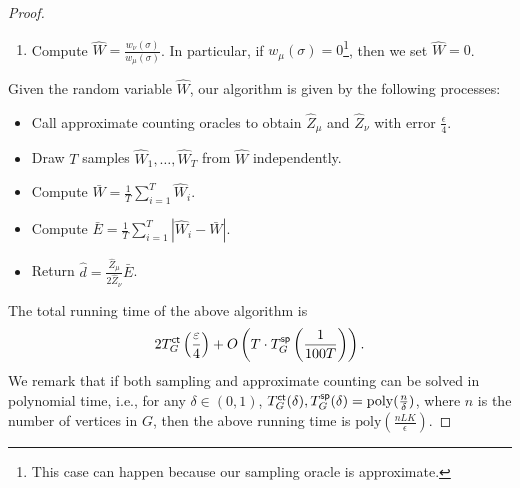 \begin{proof}
\begin{enumerate}
\item Compute $\hat{W}=\frac{w_\nu(\sigma)}{w_\mu(\sigma)}$. In particular, if $w_\mu(\sigma)=0$\footnote{This case can happen because our sampling oracle is approximate.}, then we set $\hat{W} = 0$.
\end{enumerate}
Given the random variable $\hat{W}$, our algorithm is given by the following processes:
\begin{tcolorbox}[colback=lightgray!20, colframe=lightgray!18, coltitle=black, title={\textbf{Basic algorithm for instances satisfying \Cref{cond:meta}}}]
    \begin{itemize}
        \item Call approximate counting oracles to obtain $\hat{Z}_\mu$ and $\hat{Z}_\nu$ with error $\frac{\epsilon}{4}$.
        \item Draw $T$ samples $\hat{W}_1,\dots, \hat{W}_T$ from $\hat{W}$ independently.
        \item Compute $\bar{W}=\frac{1}{T}\sum_{i=1}^T \hat{W}_i$.
        \item Compute $\bar{E}=\frac{1}{T}\sum_{i=1}^{T} |\hat{W}_i-\bar{W}|$.
        \item Return $\hat{d}=\frac{\hat{Z}_\mu}{2\hat{Z}_\nu}\bar{E}$.
        \end{itemize}
    \end{tcolorbox}
The total running time of the above algorithm is 
\begin{align*}
    2T^{\textsf{ct}}_G\left(\frac{\varepsilon}{4}\right) + O\left(T \cdot T^{\textsf{sp}}_G\left(\frac{1}{100T}\right)\right).
\end{align*}
We remark that if both sampling and approximate counting can be solved in polynomial time, i.e., for any $\delta \in (0,1)$, $T^{\textsf{ct}}_G(\delta),T^{\textsf{sp}}_G(\delta) = \mathrm{poly}(\frac{n}{\delta})$, where $n$ is the number of vertices in $G$, then the above running time is $\mathrm{poly}(\frac{nLK}{\epsilon})$.




\end{proof}
